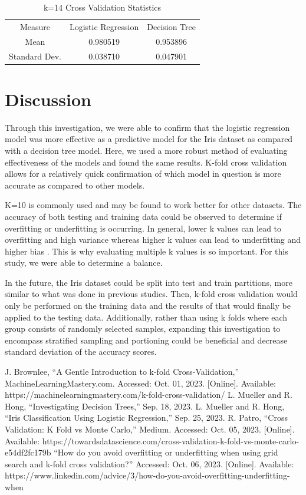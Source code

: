\documentclass[journal]{IEEEtran}
\begin{document}
\begin{table}[h!]
    \centering
    \begin{tabular}{ c | c c }
    Measure & Logistic Regression & Decision Tree \\
    Mean&	0.980519&	0.953896 \\
    Standard Dev.	&0.038710&	0.047901
    \end{tabular}
    \caption{k=14 Cross Validation Statistics}
    \label{table:MultiFoldCV-k14}
    \end{table}

\section{Discussion}
\label{sec:discussion}
Through this investigation, we were able to confirm that the logistic regression model was more effective as a predictive model for the Iris dataset as compared with a decision tree model. Here, we used a more robust method of evaluating effectiveness of the models and found the same results. K-fold cross validation allows for a relatively quick confirmation of which model in question is more accurate as compared to other models. 

K=10 is commonly used and may be found to work better for other datasets. The accuracy of both testing and training data could be observed to determine if overfitting or underfitting is occurring. In general, lower k values can lead to overfitting and high variance whereas higher k values can lead to underfitting and higher bias \cite{b5}. This is why evaluating multiple k values is so important. For this study, we were able to determine a balance.

In the future, the Iris dataset could be split into test and train partitions, more similar to what was done in previous studies. Then, k-fold cross validation would only be performed on the training data and the results of that would finally be applied to the testing data. Additionally, rather than using k folds where each group consists of randomly selected samples, expanding this investigation to encompass stratified sampling and portioning could be beneficial and decrease standard deviation of the accuracy scores.


\begin{thebibliography}{00}
J. Brownlee, “A Gentle Introduction to k-fold Cross-Validation,” MachineLearningMastery.com. Accessed: Oct. 01, 2023. [Online]. Available: https://machinelearningmastery.com/k-fold-cross-validation/
L. Mueller and R. Hong, “Investigating Decision Trees,” Sep. 18, 2023.
L. Mueller and R. Hong, “Iris Classification Using Logistic Regression,” Sep. 25, 2023.
R. Patro, “Cross Validation: K Fold vs Monte Carlo,” Medium. Accessed: Oct. 05, 2023. [Online]. Available: https://towardsdatascience.com/cross-validation-k-fold-vs-monte-carlo-e54df2fc179b
“How do you avoid overfitting or underfitting when using grid search and k-fold cross validation?” Accessed: Oct. 06, 2023. [Online]. Available: https://www.linkedin.com/advice/3/how-do-you-avoid-overfitting-underfitting-when

\end{thebibliography}
\end{document}
